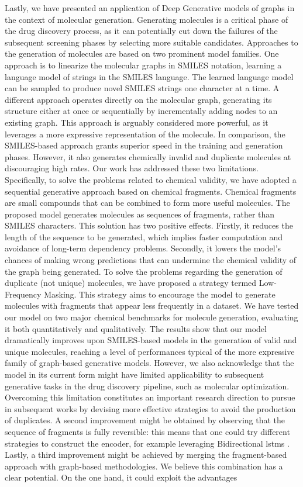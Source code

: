 Lastly, we have presented an application of Deep Generative models of graphs in the context of molecular generation. Generating molecules is a critical phase of the drug discovery process, as it can potentially cut down the failures of the subsequent screening phases by selecting more suitable candidates. Approaches to the generation of molecules are based on two prominent model families. One approach is to linearize the molecular graphs in SMILES notation, learning a language model of strings in the SMILES language. The learned language model can be sampled to produce novel SMILES strings one character at a time. A different approach operates directly on the molecular graph, generating its structure either at once or sequentially by incrementally adding nodes to an existing graph. This approach is arguably considered more powerful, as it leverages a more expressive representation of the molecule. In comparison, the SMILES-based approach grants superior speed in the training and generation phases. However, it also generates chemically invalid and duplicate molecules at discouraging high rates. Our work has addressed these two limitations. Specifically, to solve the problems related to chemical validity, we have adopted a sequential generative approach based on chemical fragments. Chemical fragments are small compounds that can be combined to form more useful molecules. The proposed model generates molecules as sequences of fragments, rather than SMILES characters. This solution has two positive effects. Firstly, it reduces the length of the sequence to be generated, which implies faster computation and avoidance of long-term dependency problems. Secondly, it lowers the model's chances of making wrong predictions that can undermine the chemical validity of the graph being generated. To solve the problems regarding the generation of duplicate (\ie not unique) molecules, we have proposed a strategy termed Low-Frequency Masking. This strategy aims to encourage the model to generate molecules with fragments that appear less frequently in a dataset. We have tested our model on two major chemical benchmarks for molecule generation, evaluating it both quantitatively and qualitatively. The results show that our model dramatically improves upon SMILES-based models in the generation of valid and unique molecules, reaching a level of performances typical of the more expressive family of graph-based generative models. However, we also acknowledge that the model in its current form might have limited applicability to subsequent generative tasks in the drug discovery pipeline, such as molecular optimization. Overcoming this limitation constitutes an important research direction to pursue in subsequent works by devising more effective strategies to avoid the production of duplicates. A second improvement might be obtained by observing that the sequence of fragments is fully reversible: this means that one could try different strategies to construct the encoder, for example leveraging Bidirectional \glspl{lstm} \cite{schuster1997bidirectionallstm}. Lastly, a third improvement might be achieved by merging the fragment-based approach with graph-based methodologies. We believe this combination has a clear  potential. On the one hand, it could exploit the advantages 